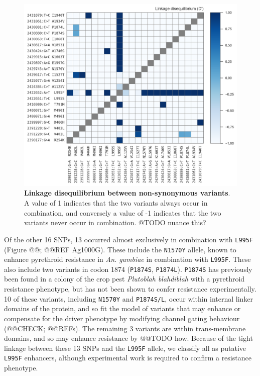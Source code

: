 \documentclass[a4paper,11pt,abstracton]{scrartcl}
\begin{document}
%
\begin{figure}[!t]

  \includegraphics[width=1\linewidth,center]{artwork/fig_ld.png}
  
  \caption{\textbf{Linkage disequilibrium between non-synonymous variants}. A value of 1 indicates that the two variants always occur in combination, and conversely a value of -1 indicates that the two variants never occur in combination. @TODO nuance this?}
  
  \label{fig:ld}
\end{figure}


%
Of the other 16 SNPs, 13 occurred almost exclusively in combination with \texttt{L995F} (Figure @@; @@REF Ag1000G).
%
These include the \texttt{N1570Y} allele, known to enhance pyrethroid resistance in \textit{An. gambiae} in combination with \texttt{L995F}.
%
These also include two variants in codon 1874 (\texttt{P1874S}, \texttt{P1874L}). \texttt{P1874S} has previously been found in a colony of the crop pest \textit{Plutoblah blahdiblah} with a pyrethroid resistance phenotype, but has not been shown to confer resistance experimentally.
%
10 of these variants, including \texttt{N1570Y} and \texttt{P1874S/L}, occur within internal linker domains of the protein, and so fit the model of variants that may enhance or compensate for the driver phenotype by modifying channel gating behaviour (@@CHECK; @@REFs).
%
The remaining 3 variants are within trans-membrane domains, and so may enhance resistance by @@TODO how.
%
Because of the tight linkage between these 13 SNPs and the \texttt{L995F} allele, we classify all as putative \texttt{L995F} enhancers, although experimental work is required to confirm a resistance phenotype.
\end{document}
